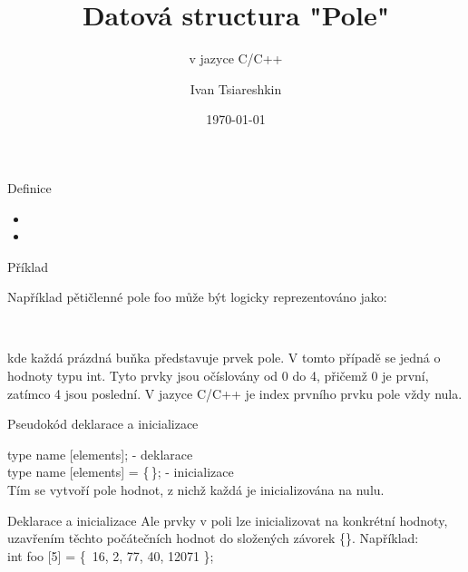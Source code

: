 \documentclass{beamer}
\title{Datová structura "Pole"}
\subtitle{v jazyce C/C++}
\author{Ivan Tsiareshkin}
\institute{Fakulta Informačních technologií\\Vysoké učení technické v Brně}
\date{\today}
\begin{document}
\frame{\titlepage}

\begin{frame}{Definice}
\begin{itemize}
    \item {}
    \item {}
\end{itemize}
\end{frame}

\begin{frame}{Příklad}
    \begin{flushleft}
    Například pětičlenné pole foo může být logicky reprezentováno jako:
    \end{flushleft}
    \begin{center}
    \\[1em]
    \end{center}
    \begin{flushleft}
    kde každá prázdná buňka představuje prvek pole.
    V tomto případě se jedná o hodnoty typu int.
    Tyto prvky jsou očíslovány od 0 do 4, přičemž 0 je první, zatímco 4 jsou poslední.
    V jazyce C/C++ je index prvního prvku pole vždy nula.
    \end{flushleft}
\end{frame}


\begin{frame}{Pseudokód deklarace a inicializace}
    \begin{flushleft}
        type name [elements]; - deklarace
        \\
        type name [elements] = \{\,\}; - inicializace
        \\
        Tím se vytvoří pole hodnot, z nichž každá je inicializována na nulu.
    \end{flushleft}
\end{frame}

\begin{frame}{Deklarace a inicializace}
    Ale prvky v poli lze inicializovat na konkrétní hodnoty, uzavřením těchto počátečních hodnot do složených závorek \{\}. Například:
    \\
    int foo [5] = \{\ 16, 2, 77, 40, 12071 \};
    \\
    \begin{center}
    \\[1em]
    \end{center}
\end{frame}
\end{document}
